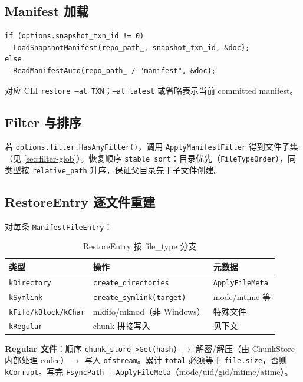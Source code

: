 \subsection{Manifest 加载}

\begin{lstlisting}[caption={Manifest 来源},label={lst:restore-manifest}]
if (options.snapshot_txn_id != 0)
  LoadSnapshotManifest(repo_path_, snapshot_txn_id, &doc);
else
  ReadManifestAuto(repo_path_ / "manifest", &doc);
\end{lstlisting}

对应 CLI \texttt{restore --at TXN}；\texttt{--at latest} 或省略表示当前 committed manifest。

\subsection{Filter 与排序}

若 \texttt{options.filter.HasAnyFilter()}，调用 \texttt{ApplyManifestFilter} 得到文件子集（见 \cref{sec:filter-glob}）。恢复顺序 \texttt{stable\_sort}：目录优先（\texttt{FileTypeOrder}），同类型按 \texttt{relative\_path} 升序，保证父目录先于子文件创建。

\subsection{RestoreEntry 逐文件重建}

对每条 \texttt{ManifestFileEntry}：

\begin{table}[htbp]
\centering
\caption{RestoreEntry 按 file\_type 分支}
\small
\begin{tabular}{@{}llp{6cm}@{}}
\toprule
类型 & 操作 & 元数据 \\
\midrule
\texttt{kDirectory} & \texttt{create\_directories} & \texttt{ApplyFileMeta} \\
\texttt{kSymlink} & \texttt{create\_symlink(target)} & mode/mtime 等 \\
\texttt{kFifo/kBlock/kChar} & mkfifo/mknod（非 Windows） & 特殊文件 \\
\texttt{kRegular} & chunk 拼接写入 & 见下文 \\
\bottomrule
\end{tabular}
\end{table}

\textbf{Regular 文件}：顺序 \texttt{chunk\_store->Get(hash)} $\rightarrow$ 解密/解压（由 ChunkStore 内部处理 codec）$\rightarrow$ 写入 \texttt{ofstream}。累计 \texttt{total} 必须等于 \texttt{file.size}，否则 \texttt{kCorrupt}。写完 \texttt{FsyncPath} + \texttt{ApplyFileMeta}（mode/uid/gid/mtime/atime）。

